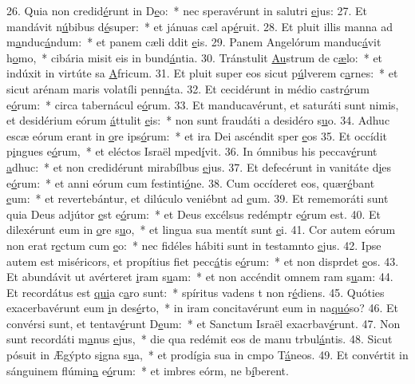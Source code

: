 26. Quia non credid\uline{é}runt in D\uline{e}o:~* nec speravérunt in salutri \uline{e}jus:
27. Et mandávit n\uline{ú}bibus d\uline{é}super:~* et jánuas cæl ap\uline{é}ruit.
28. Et pluit illis manna ad m\uline{a}nduc\uline{á}ndum:~* et panem cæli ddit \uline{e}is.
29. Panem Angelórum manduc\uline{á}vit h\uline{o}mo,~* cibária misit eis in bund\uline{á}ntia.
30. Tránstulit \uline{Au}strum de c\uline{æ}lo:~* et indúxit in virtúte sa \uline{A}fricum.
31. Et pluit super eos sicut p\uline{ú}lverem c\uline{a}rnes:~* et sicut arénam maris volatíli penn\uline{á}ta.
32. Et cecidérunt in médio castr\uline{ó}rum e\uline{ó}rum:~* circa tabernácul e\uline{ó}rum.
33. Et manducavérunt, et saturáti sunt nimis, et desidérium eórum \uline{á}ttulit \uline{e}is:~* non sunt fraudáti a desidéro s\uline{u}o.
34. Adhuc escæ eórum erant in \uline{o}re ips\uline{ó}rum:~* et ira Dei ascéndit sper \uline{e}os
35. Et occídit p\uline{i}ngues e\uline{ó}rum,~* et eléctos Israël mped\uline{í}vit.
36. In ómnibus his peccav\uline{é}runt \uline{a}dhuc:~* et non credidérunt mirabílbus \uline{e}jus.
37. Et defecérunt in vanitáte d\uline{i}es e\uline{ó}rum:~* et anni eórum cum festinti\uline{ó}ne.
38. Cum occíderet eos, quær\uline{é}bant \uline{e}um:~* et revertebántur, et dilúculo veniébnt ad \uline{e}um.
39. Et rememoráti sunt quia Deus adjútor \uline{e}st e\uline{ó}rum:~* et Deus excélsus redémptr e\uline{ó}rum est.
40. Et dilexérunt eum in \uline{o}re s\uline{u}o,~* et lingua sua mentít sunt \uline{e}i.
41. Cor autem eórum non erat r\uline{e}ctum cum \uline{e}o:~* nec fidéles hábiti sunt in testamnto \uline{e}jus.
42. Ipse autem est miséricors, et propítius fiet pecc\uline{á}tis e\uline{ó}rum:~* et non disprdet \uline{e}os.
43. Et abundávit ut avérteret \uline{i}ram s\uline{u}am:~* et non accéndit omnem ram s\uline{u}am:
44. Et recordátus est \uline{qui}a c\uline{a}ro sunt:~* spíritus vadens t non r\uline{é}diens.
45. Quóties exacerbavérunt eum \uline{i}n des\uline{é}rto,~* in iram concitavérunt eum in na\uline{quó}so?
46. Et convérsi sunt, et tentav\uline{é}runt D\uline{e}um:~* et Sanctum Israël exacrbav\uline{é}runt.
47. Non sunt recordáti m\uline{a}nus \uline{e}jus,~* die qua redémit eos de manu trbul\uline{á}ntis.
48. Sicut pósuit in Ægýpto s\uline{i}gna s\uline{u}a,~* et prodígia sua in cmpo T\uline{á}neos.
49. Et convértit in sánguinem flúmin\uline{a} e\uline{ó}rum:~* et imbres eórm, ne b\uline{í}berent.
